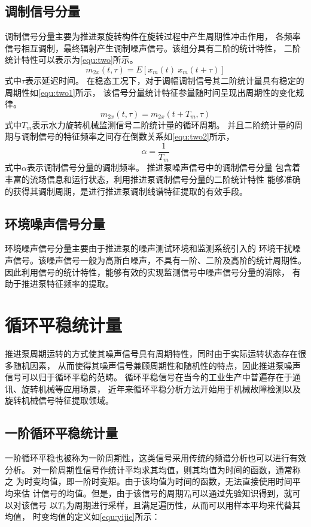 \subsection{调制信号分量}
调制信号分量主要为推进泵旋转构件在旋转过程中产生周期性冲击作用，
各频率信号相互调制，最终辐射产生调制噪声信号。该组分具有二阶的统计特性，
二阶统计特性可以表示为\autoref{equ:two}所示。
\begin{equation}
    \label{equ:two}
    m_{2x}\left ( t, \tau \right )  =E\left [ x_{m}\left ( t \right ) \ x_{m}\left ( t+\tau \right )  \right ] 
\end{equation}
式中$\tau$表示延迟时间。
在稳态工况下，对于调幅调制信号其二阶统计量具有稳定的周期性如\autoref{equ:two1}所示，
该信号分量统计特征参量随时间呈现出周期性的变化规律。
\begin{equation}
    \label{equ:two1}
    m_{2x}\left ( t, \tau \right )  =m_{2x}\left ( t+T_m, \tau \right )
\end{equation}
式中$T_m$表示水力旋转机械监测信号二阶统计量的循环周期。
并且二阶统计量的周期与调制信号的特征频率之间存在倒数关系如\autoref{equ:two2}所示，
\begin{equation}
    \label{equ:two2}
    \alpha =\frac{1}{T_{m} } 
\end{equation}
式中$\alpha$表示调制信号分量的调制频率。
推进泵噪声信号中的调制信号分量
包含着丰富的流场信息和运行状态，利用推进泵调制信号分量的二阶统计特性
能够准确的获得其调制周期，是进行推进泵调制线谱特征提取的有效手段。
\subsection{环境噪声信号分量}
环境噪声信号分量主要由于推进泵的噪声测试环境和监测系统引入的
环境干扰噪声信号。该噪声信号一般为高斯白噪声，不具有一阶、二阶及高阶的统计周期性。
因此利用信号的统计特性，能够有效的实现监测信号中噪声信号分量的消除，
有助于推进泵特征频率的提取。

\section{循环平稳统计量}
推进泵周期运转的方式使其噪声信号具有周期特性，同时由于实际运转状态存在很多随机因素，
从而使得其噪声信号兼顾周期性和随机性的特点，因此推进泵噪声信号可以归于循环平稳的范畴。
循环平稳信号在当今的工业生产中普遍存在于通讯、旋转机械等应用场景，
近年来循环平稳分析方法开始用于机械故障检测以及旋转机械信号特征提取领域。
\subsection{一阶循环平稳统计量}
一阶循环平稳也被称为一阶周期性，这类信号采用传统的频谱分析也可以进行有效分析。
对一阶周期性信号作统计平均求其均值，则其均值为时间的函数，通常称之
为时变均值，即一阶时变矩。由于该均值为时间的函数，无法直接使用时间平均来估
计信号的均值\cite{zhou2006}。但是，由于该信号的周期$T_{0}$可以通过先验知识得到，就可以对该信号
以$T_{0}$为周期进行采样，且满足遍历性，从而可以用样本平均来代替其均值，
时变均值的定义如\autoref{equ:yijie}所示：

